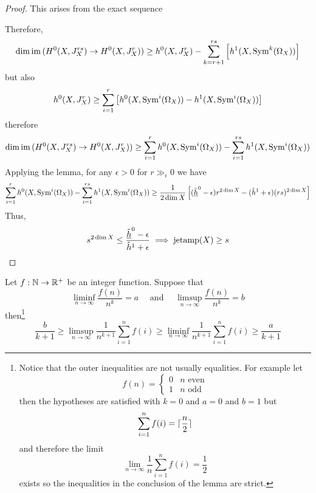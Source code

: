 \documentclass[main.tex]{subfiles}
\begin{document}
\begin{proof}
This arises from the exact sequence
\begin{center}
\end{center}
Therefore,
\[ \dim \operatorname{\mathrm{im}}{(H^0(X, J^{rs}_X) \to H^0(X, J^r_X))} \ge h^0(X, J^r_X) - \sum_{k = r+1}^{rs} \left[h^1(X, \mathrm{Sym}^{k}\! \left( \Omega_X \right)) \right] \]
but also
\[ h^0(X, J^r_X) \ge \sum_{i = 1}^r \left[ h^0(X, \mathrm{Sym}^{i}\! \left( \Omega_X \right)) - h^1(X, \mathrm{Sym}^{i}\! \left( \Omega_X \right)) \right] \]
therefore
\[ \dim \operatorname{\mathrm{im}}{(H^0(X, J^{rs}_X) \to H^0(X, J^r_X))} \ge \sum_{i = 1}^r h^0(X, \mathrm{Sym}^{i}\! \left( \Omega_X \right)) - \sum_{i = 1}^{rs} h^1(X, \mathrm{Sym}^{i}\! \left( \Omega_X \right)) \]
Applying the lemma, for any $\epsilon > 0$ for $r \gg_{\epsilon} 0$ we have
\[ \sum_{i = 1}^r h^0(X, \mathrm{Sym}^{i}\! \left( \Omega_X \right)) - \sum_{i = 1}^{rs} h^1(X, \mathrm{Sym}^{i}\! \left( \Omega_X \right)) \ge \frac{1}{2 \dim{X}} \left[ (\underline{\hat{h}}^0 - \epsilon) r^{2 \dim{X}} - (\hat{h}^1 + \epsilon) (rs)^{2 \dim{X}} \right] \]
Thus,
\[ s^{2 \dim{X}} \le \frac{\underline{\hat{h}}^0 - \epsilon}{\hat{h}^1 + \epsilon} \implies \mathrm{jetamp}(X) \ge s  \]
\end{proof}

\begin{lemma}
Let $f : \mathbb{N} \to \mathbb{R}^+$ be an integer function. Suppose that
\[ \liminf_{n \to \infty} \frac{f(n)}{n^k} = a \quad \text{ and } \quad \limsup_{n \to \infty} \frac{f(n)}{n^k} = b \]
then\footnote{Notice that the outer inequalities are not usually equalities. For example let
\[ f(n) = \begin{cases} 0 & n \text{ even} \\ 1 & n \text{ odd} \end{cases} \]
then the hypotheses are satisfied with $k = 0$ and $a = 0$ and $b = 1$ but
\[ \sum_{i = 1}^n f(i) = \lceil\frac{n}{2}\rceil \]
and therefore the limit
\[ \lim_{n \to \infty} \frac{1}{n} \sum_{i = 1}^n f(i) = \frac{1}{2} \]
exists so the inequalities in the conclusion of the lemma are strict. }
\[ \frac{b}{k+1} \ge \limsup_{n \to \infty} \frac{1}{n^{k+1}} \sum_{i = 1}^n f(i) \ge \liminf_{n \to \infty} \frac{1}{n^{k+1}} \sum_{i = 1}^n f(i) \ge \frac{a}{k+1}  \]
\end{lemma}
\end{document}
